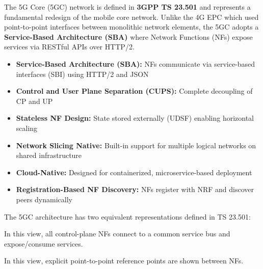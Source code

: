 
The 5G Core (5GC) network is defined in \textbf{3GPP TS 23.501} and represents a fundamental redesign of the mobile core network. Unlike the 4G EPC which used point-to-point interfaces between monolithic network elements, the 5GC adopts a \textbf{Service-Based Architecture (SBA)} where Network Functions (NFs) expose services via RESTful APIs over HTTP/\allowbreak{}2.


\begin{itemize}
\tightlist
\item
  \textbf{Service-Based Architecture (SBA):} NFs communicate via service-based interfaces (SBI) using HTTP/\allowbreak{}2 and JSON
\item
  \textbf{Control and User Plane Separation (CUPS):} Complete decoupling of CP and UP
\item
  \textbf{Stateless NF Design:} State stored externally (UDSF) enabling horizontal scaling
\item
  \textbf{Network Slicing Native:} Built-in support for multiple logical networks on shared infrastructure
\item
  \textbf{Cloud-Native:} Designed for containerized, microservice-based deployment
\item
  \textbf{Registration-Based NF Discovery:} NFs register with NRF and discover peers dynamically
\end{itemize}



The 5GC architecture has two equivalent representations defined in TS 23.501:


In this view, all control-plane NFs connect to a common service bus and expose/\allowbreak{}consume services.




In this view, explicit point-to-point reference points are shown between NFs.


